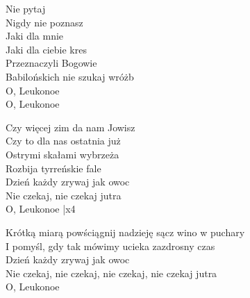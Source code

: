 \begin{text}
    \small{
    Nie pytaj\\
    Nigdy nie poznasz\\
    Jaki dla mnie\\
    Jaki dla ciebie kres\\
    Przeznaczyli Bogowie\\
    Babilońskich nie szukaj wróżb\\
    O, Leukonoe\\
    O, Leukonoe

    Czy więcej zim da nam Jowisz\\
    Czy to dla nas ostatnia już\\
    Ostrymi skałami wybrzeża\\
    Rozbija tyrreńskie fale\\
    Dzień każdy zrywaj jak owoc\\
    Nie czekaj, nie czekaj jutra\\
    O, Leukonoe |x4

    Krótką miarą powściągnij nadzieję sącz wino w puchary\\
    I pomyśl, gdy tak mówimy ucieka zazdrosny czas\\
    Dzień każdy zrywaj jak owoc\\
    Nie czekaj, nie czekaj, nie czekaj, nie czekaj jutra\\
    O, Leukonoe
    }
\end{text}
\begin{chord}

\end{chord}